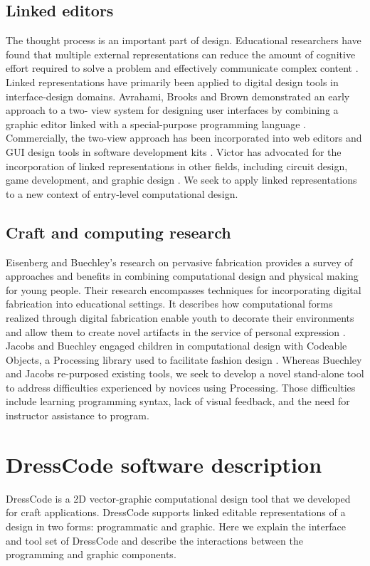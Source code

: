 \documentclass{sigchi}
\begin{document}
\subsection{Linked editors}
The thought process is an important part of design. Educational researchers have found that multiple external representations can reduce the amount of cognitive effort required to solve a problem and effectively communicate complex content \cite{ainsworth}. Linked representations have primarily been applied to digital design tools in interface-design domains. Avrahami, Brooks and Brown demonstrated an early approach to a two- view system for designing user interfaces by combining a graphic editor linked with a special-purpose programming language \cite{two_view_ui}. Commercially, the two-view approach has been incorporated into web editors and GUI design tools in software development kits \cite{view_based}. Victor has advocated for the incorporation of linked representations in other fields, including circuit design, game development, and graphic design \cite{victor}. We seek to apply linked representations to a new context of entry-level computational design.
\vspace{20pt}
\subsection{Craft and computing research}
Eisenberg and Buechley's research on pervasive fabrication provides a survey of approaches and benefits in combining computational design and physical making for young people. Their research encompasses techniques for incorporating digital fabrication into educational settings. It describes how computational forms realized through digital fabrication enable youth to decorate their environments and allow them to create novel artifacts in the service of personal expression \cite{pervasive_fab}. Jacobs and Buechley engaged children in computational design with Codeable Objects, a Processing library used to facilitate fashion design \cite{codeable_objects}. Whereas Buechley and Jacobs re-purposed existing tools, we seek to develop a novel stand-alone tool to address difficulties experienced by novices using Processing. Those difficulties include learning programming syntax, lack of visual feedback, and the need for instructor assistance to program.

\section{DressCode software description}
DressCode is a 2D vector-graphic computational design tool that we developed for craft applications. DressCode supports linked editable representations of a design in two forms: programmatic and graphic. Here we explain the interface and tool set of DressCode and describe the interactions between the programming and graphic components.
\end{document}
